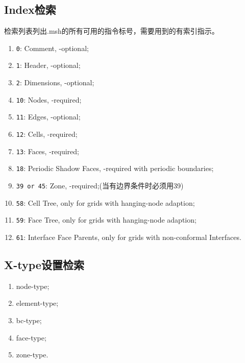 \documentclass[lang=cn,11pt,a4paper]{elegantpaper}
\begin{document}
\subsection{Index检索}
检索列表列出.msh的所有可用的指令标号，需要用到的有索引指示。
\begin{enumerate}[label=\arabic*).]
  \item \lstinline{0}: Comment, -optional;
  \item \lstinline{1}: Header, -optional;
  \item \lstinline{2}: Dimensions, -optional;
  \item \lstinline{10}: Nodes, -required;
  \item \lstinline{11}: Edges, -optional;
  \item \lstinline{12}: Cells, -required;
  \item \lstinline{13}: Faces, -required;
  \item \lstinline{18}: Periodic Shadow Faces, -required with periodic boundaries;
  \item \lstinline{39 or 45}: Zone, -required;(当有边界条件时必须用39)
  \item \lstinline{58}: Cell Tree, only for grids with hanging-node adaption;
  \item \lstinline{59}: Face Tree, only for grids with hanging-node adaption;
  \item \lstinline{61}: Interface Face Parents, only for grids with non-conformal Interfaces.
\end{enumerate}

\subsection{X-type设置检索}
\begin{enumerate}
  \item node-type;
  \item element-type;
  \item bc-type;
  \item face-type;
  \item zone-type.
\end{enumerate}
\end{document}
